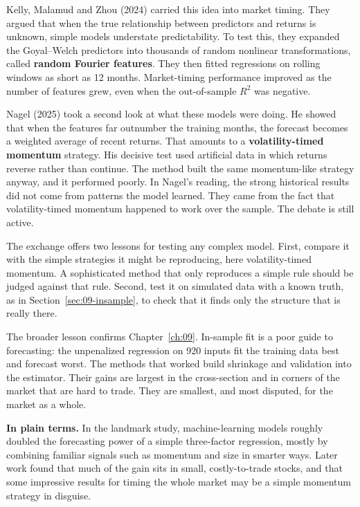 Kelly, Malamud and Zhou (2024) carried this idea into market timing. They argued that when the true relationship between predictors and returns is unknown, simple models understate predictability. To test this, they expanded the Goyal--Welch predictors into thousands of random nonlinear transformations, called \textbf{random Fourier features}. They then fitted regressions on rolling windows as short as 12 months. Market-timing performance improved as the number of features grew, even when the out-of-sample $R^2$ was negative.

Nagel (2025) took a second look at what these models were doing. He showed that when the features far outnumber the training months, the forecast becomes a weighted average of recent returns. That amounts to a \textbf{volatility-timed momentum} strategy. His decisive test used artificial data in which returns reverse rather than continue. The method built the same momentum-like strategy anyway, and it performed poorly. In Nagel's reading, the strong historical results did not come from patterns the model learned. They came from the fact that volatility-timed momentum happened to work over the sample. The debate is still active.

The exchange offers two lessons for testing any complex model. First, compare it with the simple strategies it might be reproducing, here volatility-timed momentum. A sophisticated method that only reproduces a simple rule should be judged against that rule. Second, test it on simulated data with a known truth, as in Section~\ref{sec:09-insample}, to check that it finds only the structure that is really there.

The broader lesson confirms Chapter~\ref{ch:09}. In-sample fit is a poor guide to forecasting: the unpenalized regression on 920 inputs fit the training data best and forecast worst. The methods that worked build shrinkage and validation into the estimator. Their gains are largest in the cross-section and in corners of the market that are hard to trade. They are smallest, and most disputed, for the market as a whole.

\noindent\textbf{In plain terms.} In the landmark study, machine-learning models roughly doubled the forecasting power of a simple three-factor regression, mostly by combining familiar signals such as momentum and size in smarter ways. Later work found that much of the gain sits in small, costly-to-trade stocks, and that some impressive results for timing the whole market may be a simple momentum strategy in disguise.

